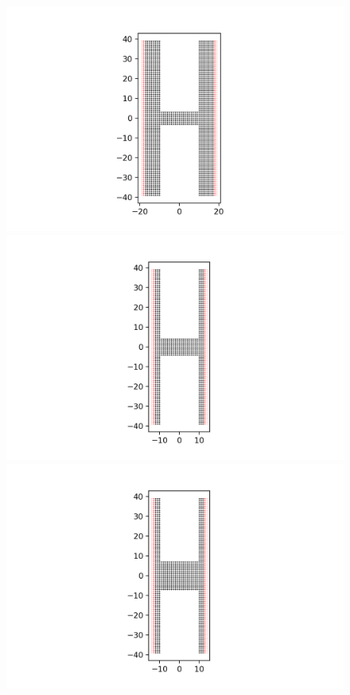 \documentclass[12pt]{article}
\numberwithin{equation}{section}
\begin{document}
\newpage
\begin{figure}
  \centering
  \begin{minipage}{0.333\textwidth}
      \centering
      \includegraphics[width=1.5\textwidth]{./media/2degconst_W4_L10.png} %
  \end{minipage}\hfill
  \begin{minipage}{0.333\textwidth}
      \centering
      \includegraphics[width=1.6\textwidth]{./media/2degconst_W5_L10.png} %
  \end{minipage}\hfill
  \begin{minipage}{0.333\textwidth}
    \centering
    \includegraphics[width=1.6\textwidth]{./media/2degconst_W8_L10.png} %

\end{minipage}
\end{figure}
\end{document}
